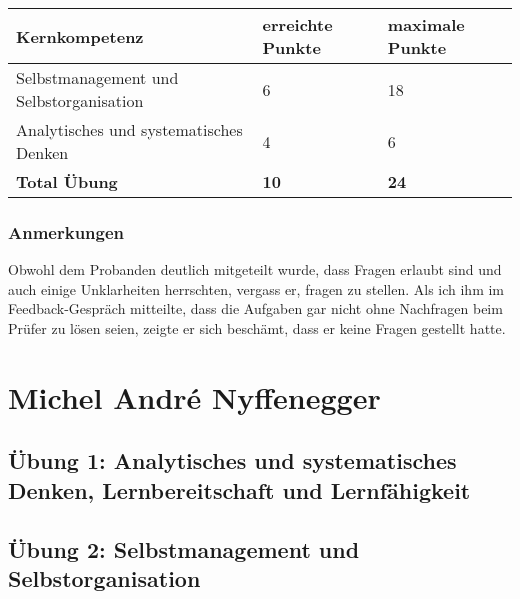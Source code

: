 \begin{center}
  \begin{tabular}{ | p{7cm} | p{3cm} | p{3cm} |}
   \hline
   \textbf{Kernkompetenz} & \textbf{erreichte Punkte} & \textbf{maximale Punkte} \\ \hline
   Selbstmanagement und Selbstorganisation & 6 & 18\\ \hline
   Analytisches und systematisches Denken & 4 & 6\\ \hline
   \textbf{Total Übung} & \textbf{10} & \textbf{24}\\ \hline
  \end{tabular}
\end{center}

\subsubsection{Anmerkungen}
Obwohl dem Probanden deutlich mitgeteilt wurde, dass Fragen erlaubt sind und auch einige Unklarheiten herrschten, vergass er, fragen zu stellen. Als ich ihm im Feedback-Gespräch mitteilte, dass die Aufgaben gar nicht ohne Nachfragen beim Prüfer zu lösen seien, zeigte er sich beschämt, dass er keine Fragen gestellt hatte.

\section{Michel André Nyffenegger}
\subsection{Übung 1: Analytisches und systematisches Denken, Lernbereitschaft und Lernfähigkeit}

\subsection{Übung 2: Selbstmanagement und Selbstorganisation}
